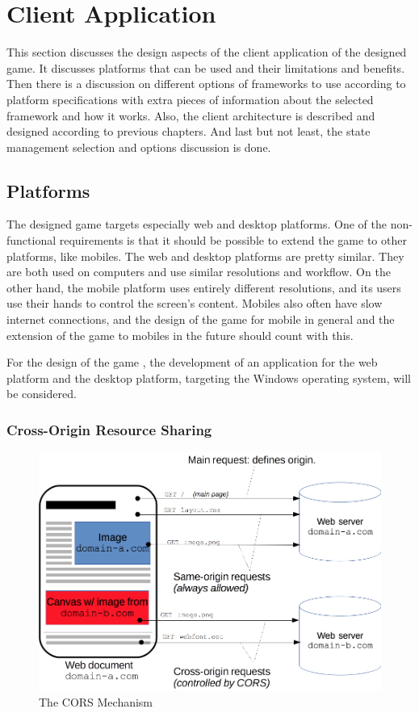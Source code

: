\section{Client Application}
\label{design:client-application}

This section discusses the design aspects of the client application of the designed game.
It discusses platforms that can be used and their limitations and benefits.
Then there is a discussion on different options of frameworks to use according to platform specifications with extra pieces of information about the selected framework and how it works.
Also, the client architecture is described and designed according to previous chapters. 
And last but not least, the state management selection and options discussion is done.

\subsection{Platforms}

The designed game targets especially web and desktop platforms.
One of the non-functional requirements is that it should be possible to extend the game to other platforms, like mobiles.
The web and desktop platforms are pretty similar.
They are both used on computers and use similar resolutions and workflow.
On the other hand, the mobile platform uses entirely different resolutions, and its users use their hands to control the screen's content.
Mobiles also often have slow internet connections, and the design of the game for mobile in general and the extension of the game to mobiles in the future should count with this.

For the design of the game \myAppName{}, the development of an application for the web platform and the desktop platform, targeting the Windows operating system, will be considered.

\subsubsection{Cross-Origin Resource Sharing}

\begin{figure}
    \centering
    \includegraphics[width=1\linewidth]{assets/design/cors.png}
    \caption{The CORS Mechanism}
    \label{fig:design:cors-mechanism}
\end{figure}

